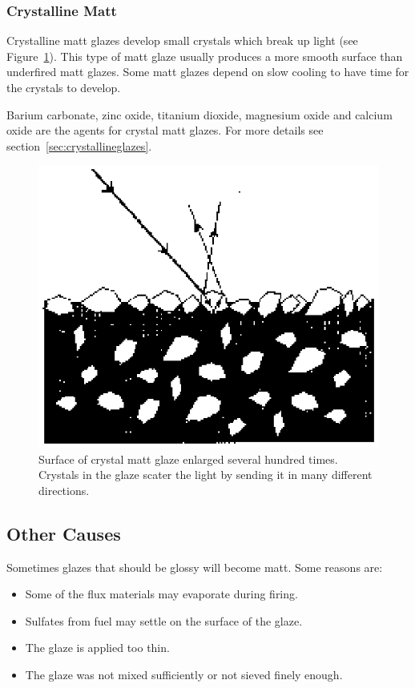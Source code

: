 \subsubsection{Crystalline Matt}
Crystalline matt glazes develop small crystals which break up light (see 
Figure~\ref{fig:crystallinematt}). This type of matt glaze usually produces a 
more smooth surface than underfired matt glazes. Some matt glazes depend on 
slow cooling to have time for the crystals to develop.

Barium carbonate, zinc oxide, titanium dioxide, magnesium oxide and calcium 
oxide are the agents for crystal matt glazes. For more details see 
section~\ref{sec:crystallineglazes}.
\begin{figure}[htbp!]
  \centering
  \includegraphics[width=0.5\linewidth]{img/crystallinematt.eps}
  \caption{Surface of crystal matt glaze enlarged several hundred times. 
    Crystals in the glaze scater the light by sending it in many different 
    directions.}
  \label{fig:crystallinematt}
\end{figure}
\subsection{Other Causes}
Sometimes glazes that should be glossy will become matt. Some reasons 
are:
\begin{itemize}
\item Some of the flux materials may evaporate during firing.
\item Sulfates from fuel may settle on the surface of the glaze.
\item The glaze is applied too thin.
\item The glaze was not mixed sufficiently or not sieved finely enough.
\end{itemize}
